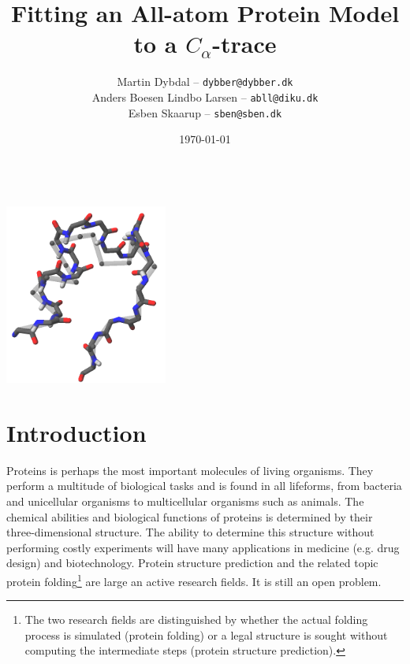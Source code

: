 \documentclass[10pt,a4paper,final,oneside,openany,article,twocolumn]{memoir}
\title{\vspace{-2cm}
  Fitting an All-atom Protein Model to a $C_\alpha$-trace\\
}
\author{
	Martin Dybdal -- \texttt{dybber@dybber.dk}\\
	Anders Boesen Lindbo Larsen -- \texttt{abll@diku.dk} \\
	Esben Skaarup -- \texttt{sben@sben.dk}
}
\date{\today}
\begin{document}
\tableofcontents*

\newpage

\ \\

\hspace{0.5cm}\includegraphics[width=0.4\textwidth]{figures/forside.png}


\newpage
\chapter{Introduction}
Proteins is perhaps the most important molecules of living
organisms. They perform a multitude of biological tasks and is found
in all lifeforms, from bacteria and unicellular organisms to
multicellular organisms such as animals. The chemical abilities and
biological functions of proteins is determined by their
three-dimensional structure. The ability to determine this structure
without performing costly experiments will have many applications in
medicine (e.g. drug design) and biotechnology. Protein structure
prediction and the related topic protein folding\footnote{The two
  research fields are distinguished by whether the actual folding
  process is simulated (protein folding) or a legal structure is
  sought without computing the intermediate steps (protein structure
  prediction).} are large an active research fields. It is still an
open problem.
\end{document}
